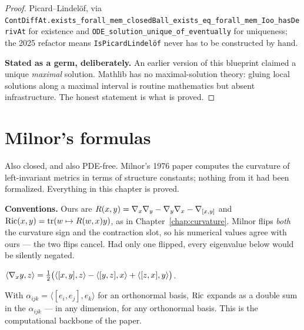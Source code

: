 \begin{proof}
  \leanok
  Picard--Lindel\"of, via
  \texttt{ContDiffAt.exists\_forall\_mem\_closedBall\_exists\_eq\_forall\_mem\_Ioo\_hasDerivAt}
  for existence and \texttt{ODE\_solution\_unique\_of\_eventually} for
  uniqueness; the 2025 refactor means \texttt{IsPicardLindel\"of} never has to
  be constructed by hand.

  \textbf{Stated as a germ, deliberately.} An earlier version of this blueprint
  claimed a unique \emph{maximal} solution. Mathlib has no maximal-solution
  theory: gluing local solutions along a maximal interval is routine
  mathematics but absent infrastructure. The honest statement is what is
  proved.
\end{proof}

\chapter{Milnor's formulas}
\label{chap:milnor}

Also closed, and also PDE-free. Milnor's 1976 paper computes the curvature of
left-invariant metrics in terms of structure constants; nothing from it had been
formalized. Everything in this chapter is proved.

\textbf{Conventions.} Ours are $R(x,y) = \nabla_x\nabla_y - \nabla_y\nabla_x -
\nabla_{[x,y]}$ and $\operatorname{Ric}(x,y) = \operatorname{tr}(w \mapsto R(w,x)y)$, as in
Chapter~\ref{chap:curvature}. Milnor flips \emph{both} the curvature sign and
the contraction slot, so his numerical values agree with ours --- the two flips
cancel. Had only one flipped, every eigenvalue below would be silently negated.

\begin{lemma}
  \label{lem:milnor-koszul}
  \leanok
  $\langle \nabla_x y, z\rangle = \tfrac12\big(\langle [x,y],z\rangle
     - \langle [y,z],x\rangle + \langle [z,x],y\rangle\big)$.
\end{lemma}

\begin{lemma}
  \label{lem:milnor-ricci}
  \leanok
  With $\alpha_{ijk} = \langle [e_i,e_j], e_k\rangle$ for an orthonormal basis,
  $\operatorname{Ric}$ expands as a double sum in the $\alpha_{ijk}$ --- in any dimension, for
  any orthonormal basis. This is the computational backbone of the paper.
\end{lemma}


